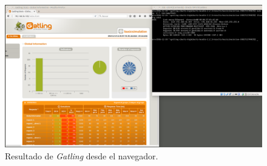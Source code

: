 \documentclass[a4paper,titlepage,12pt]{report}	%
\numberwithin{figure}{section} %
\numberwithin{table}{section} %
\begin{document}
	\begin{figure}[H]
		\includegraphics[width=\linewidth]{./Imagenes/P4/O1-4.png}
		\vspace{-0.5cm}
		\caption[Resultado de \textit{Gatling} desde el navegador.]{Resultado de \textit{Gatling} desde el navegador.}
		\label{P4-O1-4}
	\end{figure}

	\clearpage
	
	
\end{document}
